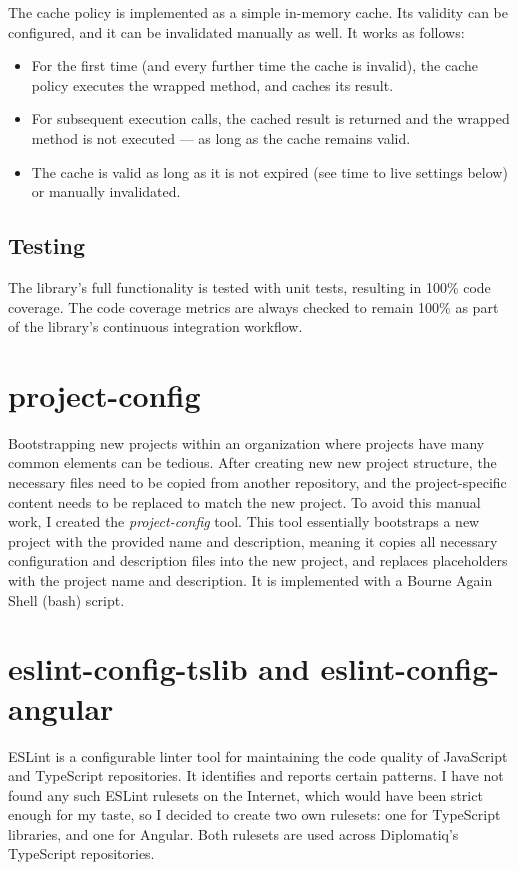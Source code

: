 The cache policy is implemented as a simple in-memory cache. Its validity can be configured, and it can be invalidated manually as well. It works as follows:

\begin{itemize}
\item For the first time (and every further time the cache is invalid), the cache policy executes the wrapped method, and caches its result.
\item For subsequent execution calls, the cached result is returned and the wrapped method is not executed — as long as the cache remains valid.
\item The cache is valid as long as it is not expired (see time to live settings below) or manually invalidated.
\end{itemize}

\subsection{Testing}

The library's full functionality is tested with unit tests, resulting in 100\% code coverage. The code coverage metrics are always checked to remain 100\% as part of the library's continuous integration workflow.

\section{project-config}

Bootstrapping new projects within an organization where projects have many common elements can be tedious. After creating new new project structure, the necessary files need to be copied from another repository, and the project-specific content needs to be replaced to match the new project. To avoid this manual work, I created the \emph{project-config} tool. This tool essentially bootstraps a new project with the provided name and description, meaning it copies all necessary configuration and description files into the new project, and replaces placeholders with the project name and description. It is implemented with a Bourne Again Shell (bash) script.

\section{eslint-config-tslib and eslint-config-angular}

ESLint is a configurable linter tool for maintaining the code quality of JavaScript and TypeScript repositories. It identifies and reports certain patterns. I have not found any such ESLint rulesets on the Internet, which would have been strict enough for my taste, so I decided to create two own rulesets: one for TypeScript libraries, and one for Angular. Both rulesets are used across Diplomatiq's TypeScript repositories.
